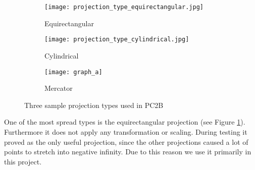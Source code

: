 \begin{figure}[h]
	\centering
	\begin{subfigure}[b]{0.3\textwidth}
		\centering
		\texttt{[image: projection\_type\_equirectangular.jpg]}
		\caption{Equirectangular}
		\label{fig:equirectangular}
	\end{subfigure}
	\hfill
	\begin{subfigure}[b]{0.3\textwidth}
		\centering
		\texttt{[image: projection\_type\_cylindrical.jpg]}
		\caption{Cylindrical}
		\label{fig:cylindrical}
	\end{subfigure}
	\hfill
	\begin{subfigure}[b]{0.3\textwidth}
		\centering
		\texttt{[image: graph\_a]}
		\caption{Mercator}
		\label{fig:mercator}
	\end{subfigure}
	\caption{Three sample projection types used in PC2B}
	\label{fig:three_projections}
\end{figure}

One of the most spread types is the equirectangular projection (see Figure \ref{fig:equirectangular}). Furthermore it does not apply any transformation or scaling. During testing it proved as the only useful projection, since the other projections caused a lot of points to stretch into negative infinity. Due to this reason we use it primarily in this project.
